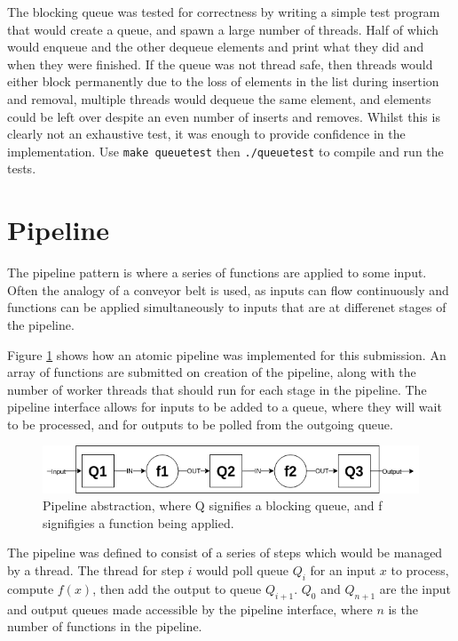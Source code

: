 \documentclass[12pt]{article}
\def\code#1{\texttt{#1}}
\begin{document}
The blocking queue was tested for correctness by writing a simple test program that would create a queue, and spawn a large number of threads. Half of which would enqueue and the other dequeue elements and print what they did and when they were finished. If the queue was not thread safe, then threads would either block permanently due to the loss of elements in the list during insertion and removal, multiple threads would dequeue the same element, and elements could be left over despite an even number of inserts and removes. Whilst this is clearly not an exhaustive test, it was enough to provide confidence in the implementation. Use \code{make queuetest} then \code{./queuetest} to compile and run the tests.

\section{Pipeline} 

The pipeline pattern is where a series of functions are applied to some input. Often the analogy of a conveyor belt is used, as inputs can flow continuously and functions can be applied simultaneously to inputs that are at differenet stages of the pipeline.

Figure \ref{fig:pipe} shows how an atomic pipeline was implemented for this submission. An array of functions are submitted on creation of the pipeline, along with the number of worker threads that should run for each stage in the pipeline. The pipeline interface allows for inputs to be added to a queue, where they will wait to be processed, and for outputs to be polled from the outgoing queue. 

\begin{figure}[!ht]
	\centering 
	\includegraphics[width=\linewidth]{images/pipe}
	\caption{Pipeline abstraction, where Q signifies a blocking queue, and f signifigies a function being applied.}
	\label{fig:pipe}
\end{figure}

The pipeline was defined to consist of a series of steps which would be managed by a thread. The thread for step $i$ would poll queue $Q_i$ for an input $x$ to process, compute $f(x)$, then add the output to queue $Q_{i+1}$. $Q_0$ and $Q_{n+1}$ are the input and output queues made accessible by the pipeline interface, where $n$ is the number of functions in the pipeline.
\end{document}
